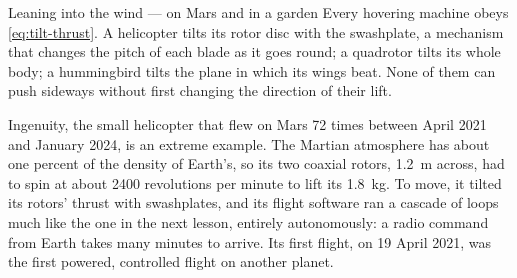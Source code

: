 \begin{curiosity}{Leaning into the wind — on Mars and in a garden}
Every hovering machine obeys \cref{eq:tilt-thrust}. A helicopter tilts its rotor disc with the swashplate, a mechanism that changes the pitch of each blade as it goes round; a quadrotor tilts its whole body; a hummingbird tilts the plane in which its wings beat. None of them can push sideways without first changing the direction of their lift.

Ingenuity, the small helicopter that flew on Mars 72 times between April 2021 and January 2024, is an extreme example. The Martian atmosphere has about one percent of the density of Earth's, so its two coaxial rotors, \SI{1.2}{m} across, had to spin at about 2400 revolutions per minute to lift its \SI{1.8}{kg}. To move, it tilted its rotors' thrust with swashplates, and its flight software ran a cascade of loops much like the one in the next lesson, entirely autonomously: a radio command from Earth takes many minutes to arrive. Its first flight, on 19 April 2021, was the first powered, controlled flight on another planet.
\end{curiosity}

